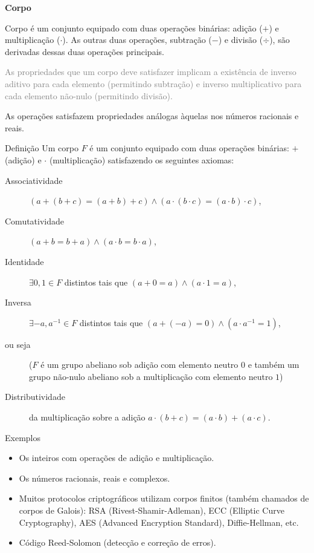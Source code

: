 \begin{frame}[allowframebreaks]
\framebreak
\textbf{Corpo}

Corpo é um conjunto equipado com duas operações binárias: adição ($+$) e multiplicação ($\cdot$). 
As outras duas operações, subtração ($-$) e divisão ($\div$), são derivadas dessas duas operações principais.

\vspace{2ex}
\textcolor{gray}{\small As propriedades que um corpo deve satisfazer implicam a existência de inverso aditivo para cada elemento (permitindo subtração) e inverso multiplicativo para cada elemento não-nulo (permitindo divisão).}

\vspace{2ex}
As operações satisfazem propriedades análogas àquelas nos números racionais e reais.

\framebreak
\begin{block}{Definição}
Um corpo $F$ é um conjunto equipado com duas operações binárias: $+$ (adição) e $\cdot$ (multiplicação) satisfazendo os seguintes axiomas:
  \begin{description}
    \item[Associatividade] $\left(a + (b + c) = (a + b) + c\right) \land \left(a \cdot (b \cdot c) = (a \cdot b) \cdot c\right)$,
    \item[Comutatividade] $\left(a + b = b + a\right) \land \left(a \cdot b = b \cdot a\right)$,
    \item[Identidade] $\exists 0, 1 \in F$ distintos tais que $(a + 0 = a) \land (a \cdot 1 = a)$,
    \item[Inversa] $\exists -a, a^{-1} \in F$ distintos tais que $(a + (-a) = 0) \land (a \cdot a^{-1} = 1)$,
    \item[ou seja] ($F$ é um grupo abeliano sob adição com elemento neutro $0$ e também um grupo não-nulo abeliano sob a multiplicação com elemento neutro $1$)
    \item[Distributividade] da multiplicação sobre a adição $a \cdot (b + c) = (a \cdot b) + (a \cdot c)$.
  \end{description}
\end{block}

\framebreak
\begin{block}{Exemplos}
  \begin{itemize}
    \item Os inteiros com operações de adição e multiplicação.
    \item Os números racionais, reais e complexos.
    \item Muitos protocolos criptográficos utilizam corpos finitos (também chamados de corpos de Galois): RSA (Rivest-Shamir-Adleman), ECC (Elliptic Curve Cryptography), AES (Advanced Encryption Standard), Diffie-Hellman, etc.
    \item Código Reed-Solomon (detecção e correção de erros).
  \end{itemize}
\end{block}


\end{frame}
